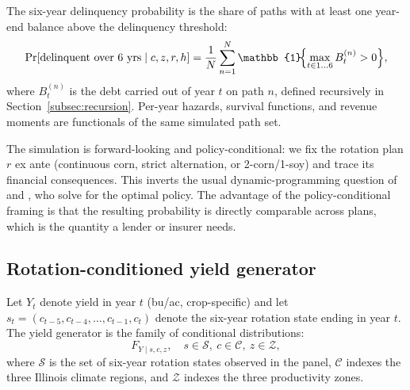 \documentclass[11pt,letterpaper]{article}
\theoremstyle{remark}
\begin{document}
The six-year delinquency probability is the share of paths with at least one year-end balance above the delinquency threshold:
\begin{equation}
\Pr[\text{delinquent over 6 yrs} \mid c, z, r, h] = \frac{1}{N}\sum_{n=1}^{N} \mathbb{1}\!\Bigl\{\max_{t \in 1\ldots 6} B^{(n)}_t > 0\Bigr\},
\end{equation}
where $B^{(n)}_t$ is the debt carried out of year $t$ on path $n$, defined recursively in Section~\ref{subsec:recursion}. Per-year hazards, survival functions, and revenue moments are functionals of the same simulated path set.
 
The simulation is forward-looking and policy-conditional: we fix the rotation plan $r$ ex ante (continuous corn, strict alternation, or 2-corn/1-soy) and trace its financial consequences. This inverts the usual dynamic-programming question of \citet{Burt1963} and \citet{Livingston2015}, who solve for the optimal policy. The advantage of the policy-conditional framing is that the resulting probability is directly comparable across plans, which is the quantity a lender or insurer needs.
 
\subsection{\label{subsec:generator}Rotation-conditioned yield generator}
 
Let $Y_t$ denote yield in year $t$ (bu/ac, crop-specific) and let $s_t = (c_{t-5}, c_{t-4}, \ldots, c_{t-1}, c_t)$ denote the six-year rotation state ending in year $t$. The yield generator is the family of conditional distributions:
\begin{equation}
F_{Y \mid s, c, z}, \quad s \in \mathcal{S},\ c \in \mathcal{C},\ z \in \mathcal{Z},
\end{equation}
where $\mathcal{S}$ is the set of six-year rotation states observed in the panel, $\mathcal{C}$ indexes the three Illinois climate regions, and $\mathcal{Z}$ indexes the three productivity zones.
 
\end{document}
